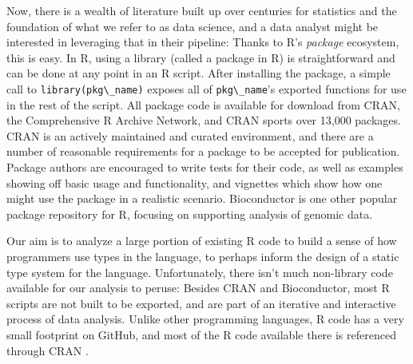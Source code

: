 \documentclass[acmsmall,10pt,review,anonymous]{acmart}\settopmatter{printfolios=true,printccs=false,printacmref=false}
\newcommand{\code}[1]{\lstinline|#1|\xspace}
\begin{document}
Now, there is a wealth of literature built up over centuries for statistics and the foundation of what we refer to as data science, and a data analyst might be interested in leveraging that in their pipeline:
Thanks to R's {\it package} ecosystem, this is easy.
In R, using a library (called a package in R) is straightforward and can be done at any point in an R script.
After installing the package, a simple call to \code{library(pkg\_name)} exposes all of \code{pkg\_name}'s exported functions for use in the rest of the script.
All package code is available for download from CRAN, the Comprehensive R Archive Network, and CRAN sports over 13,000 packages.
CRAN is an actively maintained and curated environment, and there are a number of reasonable requirements for a package to be accepted for publication.
Package authors are encouraged to write tests for their code, as well as examples showing off basic usage and functionality, and vignettes which show how one might use the package in a realistic scenario.
Bioconductor is one other popular package repository for R, focusing on supporting analysis of genomic data.

Our aim is to analyze a large portion of existing R code to build a sense of how programmers use types in the language, to perhaps inform the design of a static type system for the language.
Unfortunately, there isn't much non-library code available for our analysis to peruse:
Besides CRAN and Bioconductor, most R scripts are not built to be exported, and are part of an iterative and interactive process of data analysis.
Unlike other programming languages, R code has a very small footprint on GitHub, and most of the R code available there is referenced through CRAN .


%
\end{document}

